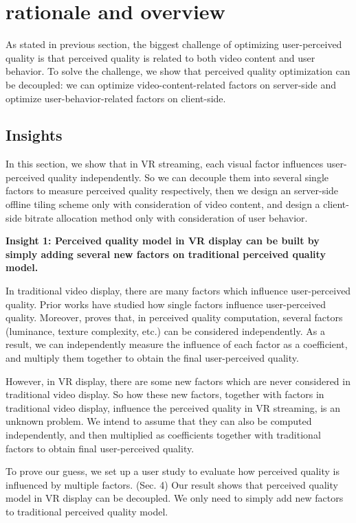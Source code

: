 
\section{\name rationale and overview}


As stated in previous section, the biggest challenge of optimizing user-perceived quality is that perceived quality is related to both video content and user behavior. To solve the challenge, we show that perceived quality optimization can be decoupled: we can optimize video-content-related factors on server-side and optimize user-behavior-related factors on client-side.

\subsection{Insights}
In this section, we show that in VR streaming, each visual factor influences user-perceived quality independently. So we can decouple them into several single factors to measure perceived quality respectively, then we design an server-side offline tiling scheme only with consideration of video content, and design a client-side bitrate allocation method only with consideration of user behavior.

\textbf{Insight 1: Perceived quality model in VR display can be built by simply adding several new factors on traditional perceived quality model.}

In traditional video display, there are many factors which influence user-perceived quality. Prior works have studied how single factors influence user-perceived quality. Moreover, \cite{distance} proves that, in perceived quality computation, several factors (luminance, texture complexity, etc.) can be considered independently. As a result, we can independently measure the influence of each factor as a coefficient, and multiply them together to obtain the final user-perceived quality.

However, in VR display, there are some new factors which are never considered in traditional video display. So how these new factors, together with factors in traditional video display, influence the perceived quality in VR streaming, is an unknown problem. We intend to assume that they can also be computed independently, and then multiplied as coefficients together with traditional factors to obtain final user-perceived quality.

To prove our guess, we set up a user study to evaluate how perceived quality is influenced by multiple factors. (Sec. 4) Our result shows that perceived quality model in VR display can be decoupled. We only need to simply add new factors to traditional perceived quality model.


